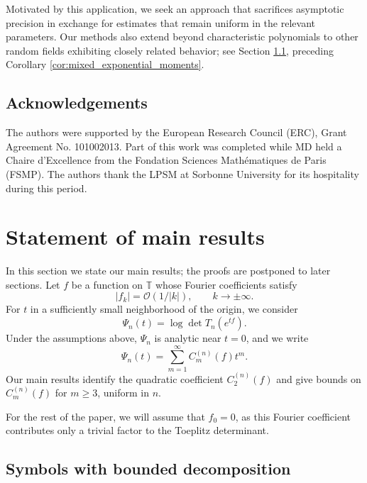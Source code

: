 \documentclass[11pt]{amsart}
\theoremstyle{plain}
\theoremstyle{remark}
\numberwithin{equation}{section}
\begin{document}
Motivated by this application, we seek an approach that sacrifices asymptotic precision in exchange for estimates that remain uniform in the relevant parameters. Our methods also extend beyond characteristic polynomials to other random fields exhibiting closely related behavior; see Section \ref{sec:bounded_dec}, preceding Corollary \ref{cor:mixed_exponential_moments}.
%
%


\subsection{Acknowledgements}
The authors were supported by the European Research Council (ERC), Grant Agreement No. 101002013.
Part of this work was completed while MD held a Chaire d’Excellence from the Fondation Sciences Math\'ematiques
de Paris (FSMP). The authors thank the LPSM at Sorbonne University for its hospitality during this period.
%
%
%
%
%
%
%
%
\section{Statement of main results}


In this section we state our main results; the proofs are postponed to later sections. Let \(f\) be a function on \(\mathbb T\) whose Fourier coefficients satisfy
\begin{equation}\label{eq:condition_on_fk}
|f_k| = \mathcal O(1/|k|), \qquad k \to \pm \infty.
\end{equation}
%
For \(t\) in a sufficiently small neighborhood of the origin, we consider
\begin{equation}\label{eqn:cumulant_generating_function}
\Psi_n(t)=\log \det T_n(e^{tf}).
\end{equation}
Under the assumptions above, \(\Psi_n\) is analytic near \(t=0\), and we write
\[
\Psi_n(t)=\sum_{m=1}^{\infty}C_m^{(n)}(f)t^m.
\]
Our main results identify the quadratic coefficient \(C_2^{(n)}(f)\) and give bounds on \(C_m^{(n)}(f)\) for \(m\ge3\), uniform in \(n\).


For the rest of the paper, we will assume that $f_0=0$, as this Fourier coefficient contributes only a trivial factor to the Toeplitz determinant. 



\subsection{Symbols with bounded decomposition} \label{sec:bounded_dec}
\end{document}
